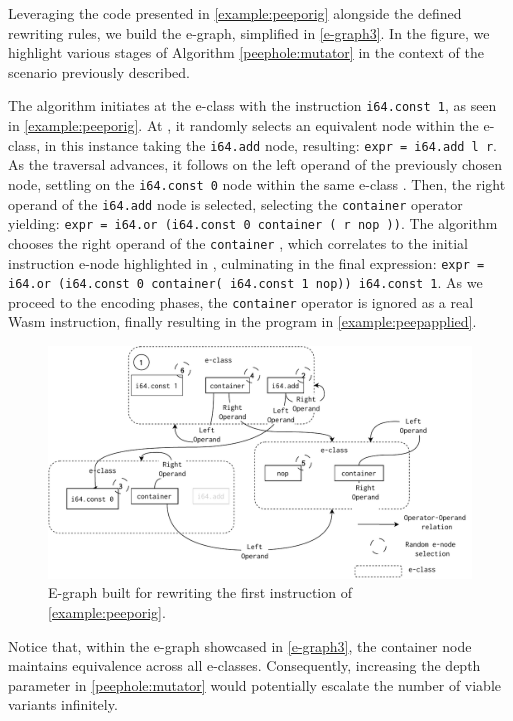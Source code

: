 


Leveraging the code presented in \autoref{example:peeporig} alongside the defined rewriting rules, we build the e-graph, simplified in \autoref{e-graph3}.
In the figure, we highlight various stages of Algorithm \ref{peephole:mutator} in the context of the scenario previously described. 



The algorithm initiates at the e-class with the instruction \texttt{i64.const 1}, as seen in \autoref{example:peeporig}.
At , it randomly selects an equivalent node within the e-class, in this instance taking the \texttt{i64.add} node, resulting: {\texttt{expr = i64.add l r}}.
As the traversal advances, it follows on the left operand of the previously chosen node, settling on the \texttt{i64.const 0} node within the same e-class .
Then, the right operand of the \texttt{i64.add} node is selected, selecting the \texttt{container}  operator yielding:
{\texttt{expr = i64.or (i64.const 0 container ( r nop ))}}.
The algorithm chooses the right operand of the \texttt{container} , which correlates to the initial instruction e-node highlighted in , culminating in the final expression:
{\texttt{expr = i64.or (i64.const 0 container( i64.const 1 nop))\ i64.const 1}}.
As we proceed to the encoding phases, the \texttt{container} operator is ignored as a real Wasm instruction, finally resulting in the program in \autoref{example:peepapplied}.

\begin{figure}[H]
  \centering
  \includegraphics[width=0.9\linewidth]{figures/e-graph-traversal2.pdf}
  \caption{E-graph built for rewriting the first instruction of \autoref{example:peeporig}. }
\label{e-graph3}
\end{figure}

Notice that, within the e-graph showcased in \autoref{e-graph3}, the container node maintains equivalence across all e-classes. 
Consequently, increasing the depth parameter in \autoref{peephole:mutator} would potentially escalate the number of viable variants infinitely.


